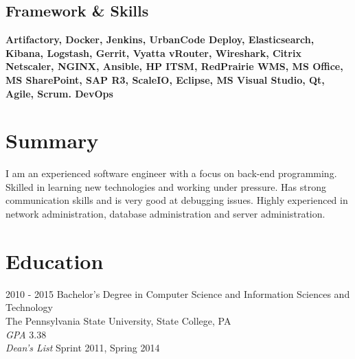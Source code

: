 \documentclass[]{friggeri-cv}
\begin{document}
\begin{aside}
  \section{Framework & Skills}
    \textbf{Artifactory, Docker, Jenkins, UrbanCode Deploy, Elasticsearch, Kibana, Logstash,
    Gerrit, Vyatta vRouter, Wireshark, Citrix Netscaler, NGINX, Ansible, HP ITSM, RedPrairie WMS,
    MS Office, MS SharePoint, SAP R3, ScaleIO, Eclipse, MS Visual Studio, Qt, Agile, Scrum. DevOps}
\end{aside}

\section{Summary}
  {I am an experienced software engineer with a focus on back-end programming. Skilled in learning new
  technologies and working under pressure. Has strong communication skills and is very good at
  debugging issues. Highly experienced in network administration, database administration and server
  administration.\\}

\section{Education}
\begin{entrylist}
  \entry
    {2010 - 2015}
    {Bachelor's Degree in Computer Science and Information Sciences and Technology}
    {\\The Pennsylvania State University, State College, PA\\}
    {\emph{GPA} 3.38\\
    \emph{Dean's List} Sprint 2011, Spring 2014\\}

\end{entrylist}
\end{document}

